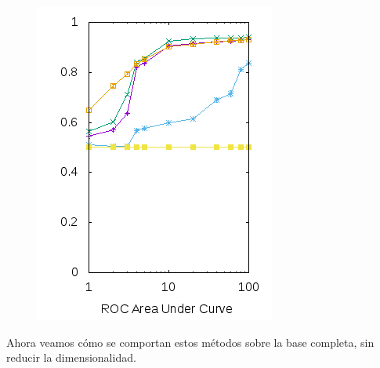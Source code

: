 \documentclass[10pt, a4paper]{article}
\begin{document}
\begin{figure}[H]
\begin{minipage}{1\textwidth}
	\includegraphics[scale=0.5]{../src/data/roica.png}
  \end{minipage}
\end{figure}

Ahora veamos cómo se comportan estos métodos sobre la base completa, sin reducir la dimensionalidad.
\end{document}
